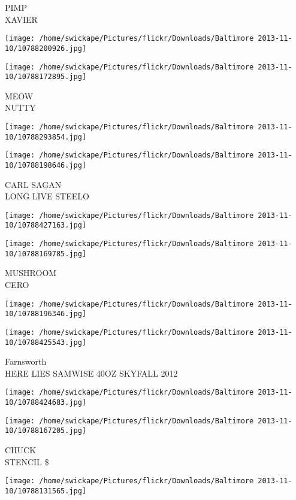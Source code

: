 \documentclass[10pt,letterpaper]{article}
\begin{document}
PIMP\\
XAVIER
\pagebreak

\texttt{[image: /home/swickape/Pictures/flickr/Downloads/Baltimore 2013-11-10/10788200926.jpg]}

\vspace{0.25in}
\texttt{[image: /home/swickape/Pictures/flickr/Downloads/Baltimore 2013-11-10/10788172895.jpg]}

MEOW\\
NUTTY
\pagebreak

\texttt{[image: /home/swickape/Pictures/flickr/Downloads/Baltimore 2013-11-10/10788293854.jpg]}

\vspace{0.25in}
\texttt{[image: /home/swickape/Pictures/flickr/Downloads/Baltimore 2013-11-10/10788198646.jpg]}

CARL SAGAN\\
LONG LIVE STEELO
\pagebreak

\texttt{[image: /home/swickape/Pictures/flickr/Downloads/Baltimore 2013-11-10/10788427163.jpg]}

\vspace{0.25in}
\texttt{[image: /home/swickape/Pictures/flickr/Downloads/Baltimore 2013-11-10/10788169785.jpg]}

MUSHROOM\\
CERO
\pagebreak

\texttt{[image: /home/swickape/Pictures/flickr/Downloads/Baltimore 2013-11-10/10788196346.jpg]}

\vspace{0.25in}
\texttt{[image: /home/swickape/Pictures/flickr/Downloads/Baltimore 2013-11-10/10788425543.jpg]}

Farnsworth\\
HERE LIES SAMWISE 40OZ SKYFALL 2012
\pagebreak

\texttt{[image: /home/swickape/Pictures/flickr/Downloads/Baltimore 2013-11-10/10788424683.jpg]}

\vspace{0.25in}
\texttt{[image: /home/swickape/Pictures/flickr/Downloads/Baltimore 2013-11-10/10788167205.jpg]}

CHUCK\\
STENCIL \$
\pagebreak

\texttt{[image: /home/swickape/Pictures/flickr/Downloads/Baltimore 2013-11-10/10788131565.jpg]}
\end{document}
